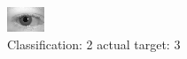 \begin{figure}[h!]
\begin{center}
\includegraphics[width=0.60\columnwidth]{figures/ID519_class_2_target_3.png}
\end{center}
\caption{ Classification: 2 actual target: 3}
\label{fig:ID519_class_2_target_3}
\end{figure}
